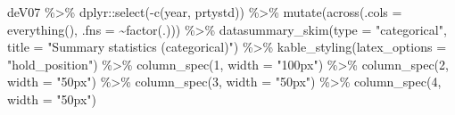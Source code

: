 \documentclass[
]{article}
\newenvironment{Shaded}{\begin{snugshade}}{\end{snugshade}}
\newcommand{\AttributeTok}[1]{\textcolor[rgb]{0.77,0.63,0.00}{#1}}
\newcommand{\DecValTok}[1]{\textcolor[rgb]{0.00,0.00,0.81}{#1}}
\newcommand{\FunctionTok}[1]{\textcolor[rgb]{0.00,0.00,0.00}{#1}}
\newcommand{\NormalTok}[1]{#1}
\newcommand{\SpecialCharTok}[1]{\textcolor[rgb]{0.00,0.00,0.00}{#1}}
\newcommand{\StringTok}[1]{\textcolor[rgb]{0.31,0.60,0.02}{#1}}
\begin{document}
\begin{Shaded}
\begin{Highlighting}[]
\NormalTok{deV07 }\SpecialCharTok{\%\textgreater{}\%}
\NormalTok{  dplyr}\SpecialCharTok{::}\FunctionTok{select}\NormalTok{(}\SpecialCharTok{{-}}\FunctionTok{c}\NormalTok{(year, prtystd)) }\SpecialCharTok{\%\textgreater{}\%} 
  \FunctionTok{mutate}\NormalTok{(}\FunctionTok{across}\NormalTok{(}\AttributeTok{.cols =} \FunctionTok{everything}\NormalTok{(), }
                \AttributeTok{.fns =} \SpecialCharTok{\textasciitilde{}}\FunctionTok{factor}\NormalTok{(.))) }\SpecialCharTok{\%\textgreater{}\%}
  \FunctionTok{datasummary\_skim}\NormalTok{(}\AttributeTok{type =} \StringTok{"categorical"}\NormalTok{, }
                   \AttributeTok{title =} \StringTok{"Summary statistics (categorical)"}\NormalTok{) }\SpecialCharTok{\%\textgreater{}\%}
  \FunctionTok{kable\_styling}\NormalTok{(}\AttributeTok{latex\_options =} \StringTok{"hold\_position"}\NormalTok{) }\SpecialCharTok{\%\textgreater{}\%}
  \FunctionTok{column\_spec}\NormalTok{(}\DecValTok{1}\NormalTok{, }\AttributeTok{width =} \StringTok{"100px"}\NormalTok{) }\SpecialCharTok{\%\textgreater{}\%}
  \FunctionTok{column\_spec}\NormalTok{(}\DecValTok{2}\NormalTok{, }\AttributeTok{width =} \StringTok{"50px"}\NormalTok{) }\SpecialCharTok{\%\textgreater{}\%}
  \FunctionTok{column\_spec}\NormalTok{(}\DecValTok{3}\NormalTok{, }\AttributeTok{width =} \StringTok{"50px"}\NormalTok{) }\SpecialCharTok{\%\textgreater{}\%}
  \FunctionTok{column\_spec}\NormalTok{(}\DecValTok{4}\NormalTok{, }\AttributeTok{width =} \StringTok{"50px"}\NormalTok{)}
\end{Highlighting}
\end{Shaded}
\end{document}
